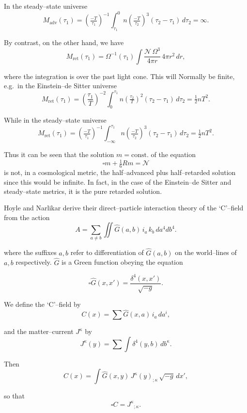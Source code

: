 In the steady--state universe
\[
M_{\text{adv}}(\tau_{1}) 
= \left(\tfrac{-T}{\tau_{1}}\right)^{-1} 
\int_{\tau_{1}}^{0} n \left(\tfrac{-T}{\tau_{2}}\right)^{3} (\tau_{2}-\tau_{1})\, d\tau_{2}
= \infty.
\]

\medskip

By contrast, on the other hand, we have
\[
M_{\text{ret}}(\tau_{1}) = \Omega^{-1}(\tau_{1}) 
\int \frac{\mathcal{N}\,\Omega^{3}}{4\pi r}\, 4\pi r^{2}\, dr,
\]

where the integration is over the past light cone. This will Normally be finite, e.g.\ in the Einstein--de Sitter universe
\[
M_{\text{ret}}(\tau_{1}) 
= \left(\frac{\tau_{1}}{T}\right)^{-2} 
\int_{0}^{\tau_{1}} n \left(\tfrac{\tau_{2}}{T}\right)^{2} (\tau_{2}-\tau_{1})\, d\tau_{2}
= \tfrac{1}{2} n T^{2}.
\]

While in the steady--state universe
\[
M_{\text{ret}}(\tau_{1}) 
= \left(\tfrac{-T}{\tau_{1}}\right)^{-1} 
\int_{-\infty}^{\tau_{1}} n \left(\tfrac{-T}{\tau_{2}}\right)^{3} (\tau_{2}-\tau_{1})\, d\tau_{2}
= \tfrac{1}{2} n T^{2}.
\]

Thus it can be seen that the solution \(m = \text{const.}\) of the equation
\[
\square m + \tfrac{1}{6} R m = \mathcal{N}
\]
is not, in a cosmological metric, the half--advanced plus half--retarded solution 
since this would be infinite. In fact, in the case of the Einstein--de Sitter 
and steady--state metrics, it is the pure retarded solution.


Hoyle and Narlikar derive their direct--particle interaction theory of the 
`C'--field from the action
\[
A = \sum_{a \ne b} \iint \hat{G}(a,b)\, i_{a} \, k_{b}\, da^{4} db^{4}.
\]

where the suffixes \(a, b\) refer to differentiation of 
\(\hat{G}(a,b)\) on the world--lines of \(a, b\) respectively.  
\(\hat{G}\) is a Green function obeying the equation

\[
\square \hat{G}(x,x') = \frac{\delta^{4}(x,x')}{\sqrt{-g}}.
\]

We define the `C'--field by
\[
C(x) = \sum \hat{G}(x,a)\, i_{a}\, da^{i},
\]

and the matter--current \(J^{\kappa}\) by
\[
J^{\kappa}(y) = \sum \int \delta^{4}(y,b)\, db^{\kappa}.
\]

Then
\[
C(x) = \int \hat{G}(x,y)\, J^{\kappa}(y)_{;\kappa}\, \sqrt{-g}\, dx',
\]

so that
\[
\square C = J^{\kappa}{}_{;\kappa}.
\]

